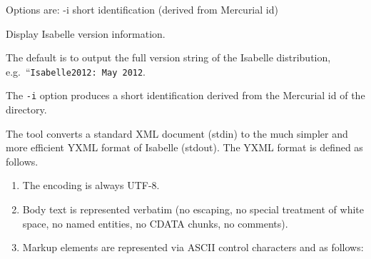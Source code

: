 \begin{isabellebody}
\begin{isamarkuptext}
\begin{ttbox}
  Options are:
    -i           short identification (derived from Mercurial id)

  Display Isabelle version information.
\end{ttbox}

  \medskip The default is to output the full version string of the
  Isabelle distribution, e.g.\ ``\verb|Isabelle2012: May 2012|.

  The \verb|-i| option produces a short identification derived
  from the Mercurial id of the \hyperlink{setting.ISABELLE-HOME}{\mbox{}} directory.%
\end{isamarkuptext}%
\isamarkuptrue%
%
\isamarkuptrue%
%
\begin{isamarkuptext}%
The \hypertarget{tool.yxml}{\hyperlink{tool.yxml}{\mbox{}}} tool converts a standard XML document (stdin)
  to the much simpler and more efficient YXML format of Isabelle
  (stdout).  The YXML format is defined as follows.

  \begin{enumerate}

  \item The encoding is always UTF-8.

  \item Body text is represented verbatim (no escaping, no special
  treatment of white space, no named entities, no CDATA chunks, no
  comments).

  \item Markup elements are represented via ASCII control characters
   and  as follows:


\end{enumerate}
\end{isamarkuptext}
\end{isabellebody}
